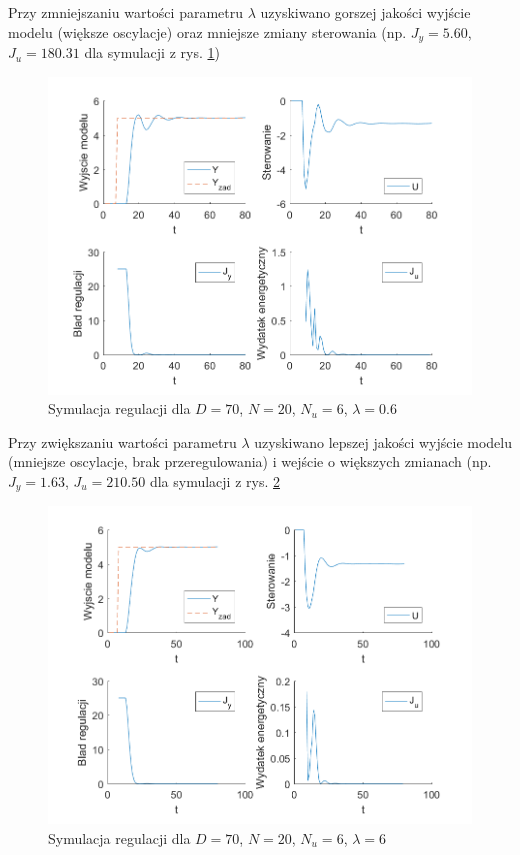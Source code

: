 \documentclass[a4paper, 10pt]{article}
\begin{document}
	Przy zmniejszaniu wartości parametru $\lambda$ uzyskiwano gorszej jakości wyjście modelu (większe oscylacje) oraz mniejsze zmiany sterowania (np. $J_y=5.60$, $J_u=180.31$ dla symulacji z rys. \ref{fig:z4_2})
	
	\begin{figure}[H]
				\centering
				\includegraphics[width=0.9\linewidth]{z4_70_20_6_06}
				\caption{Symulacja regulacji dla $D=70$, $N=20$, $N_u=6$, $\lambda=0.6$}
				\label{fig:z4_2}
				\end{figure}
				
	Przy zwiększaniu wartości parametru $\lambda$ uzyskiwano lepszej jakości wyjście modelu (mniejsze oscylacje, brak przeregulowania) i wejście o większych zmianach (np. $J_y=1.63$, $J_u=210.50$ dla symulacji z rys. \ref{fig:z4_3}
	
		\begin{figure}[H]
					\centering
					\includegraphics[width=0.9\linewidth]{z4_70_20_6_6}
					\caption{Symulacja regulacji dla $D=70$, $N=20$, $N_u=6$, $\lambda=6$}
					\label{fig:z4_3}
					\end{figure}
					
\end{document}
